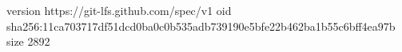 version https://git-lfs.github.com/spec/v1
oid sha256:11ca703717df51dcd0ba0c0b535adb739190e5bfe22b462ba1b55c6bff4ea97b
size 2892
